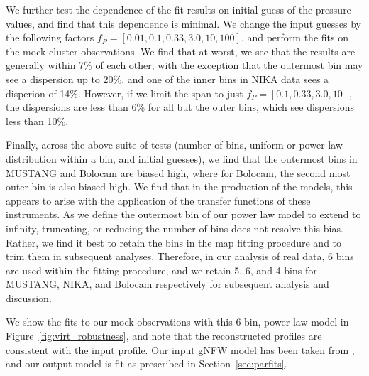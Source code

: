 \documentclass[twocolumn,traditabstract]{aa}
\begin{document}
We further test the dependence of the fit results on initial guess of the pressure values, and find that this
dependence is minimal. We change the input guesses by the
following factors $f_P = [0.01,0.1,0.33,3.0,10,100]$, and perform the fits on the mock cluster observations.
We find that at worst, we see that the results are generally within 7\% of each other, with the exception
that the outermost bin may see a dispersion up to 20\%, and one of the inner bins in NIKA data sees a disperion
of 14\%. However, if we limit the span to just $f_P = [0.1,0.33,3.0,10]$, the dispersions are less than 6\%
for all but the outer bins, which see dispersions less than 10\%.

Finally, across the above suite of tests (number of bins, uniform or power law distribution within a bin, and
initial guesses), we find that the outermost bins in MUSTANG and Bolocam are biased high, where for Bolocam,
the second most outer bin is also biased high. We find that in the production of the models, this appears to arise
with the application of the transfer functions of these instruments. As we define the outermost bin of our power
law model to extend to infinity, truncating, or reducing the number of bins does not resolve this bias. Rather,
we find it best to retain the bins in the map fitting procedure and to trim them in subsequent analyses. Therefore,
in our analysis of real data, 6 bins are used within the fitting procedure, and we retain 5, 6, and 4 bins for
MUSTANG, NIKA, and Bolocam respectively for subsequent analysis and discussion.

We show the fits to our mock observations with this 6-bin, power-law model in Figure~\ref{fig:virt_robustness},
and note that the reconstructed profiles are consistent with the input profile. Our input gNFW model has been taken
from \citet{romero2017}, and our output model is fit as prescribed in Section~\ref{sec:parfits}.



\end{document}
